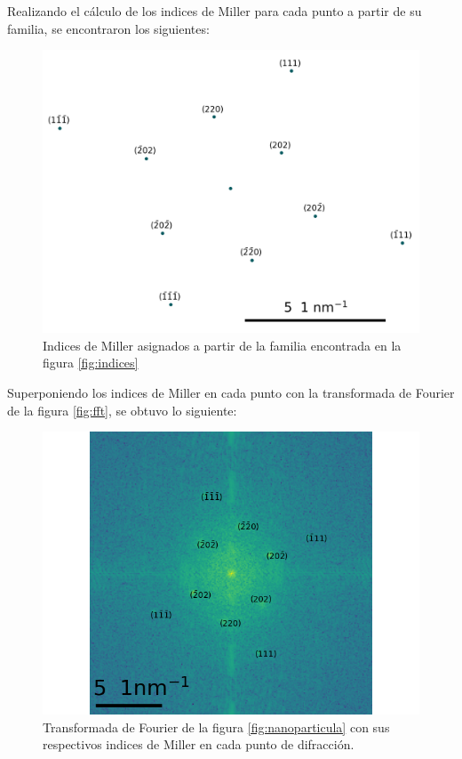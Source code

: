 \documentclass[reprint,amsmath,amssymb,aps,]{revtex4-2}
\begin{document}
Realizando el cálculo de los indices de Miller para cada punto a partir de su familia, se encontraron los siguientes:
\begin{figure}[H]
    \includegraphics[scale=0.4]{../Graphics/lattice.png}
    \caption{Indices de Miller asignados a partir de la familia encontrada en la figura \ref{fig:indices}}
    \label{fig:lattice}
\end{figure}
Superponiendo los indices de Miller en cada punto con la transformada de Fourier de la figura \ref{fig:fft}, se obtuvo lo siguiente:
\begin{figure}[H]
    \includegraphics[scale=0.4]{../Graphics/caras.png}
    \caption{Transformada de Fourier de la figura \ref{fig:nanoparticula} con sus respectivos indices de Miller en cada punto de difracción.}
\end{figure}
\end{document}
